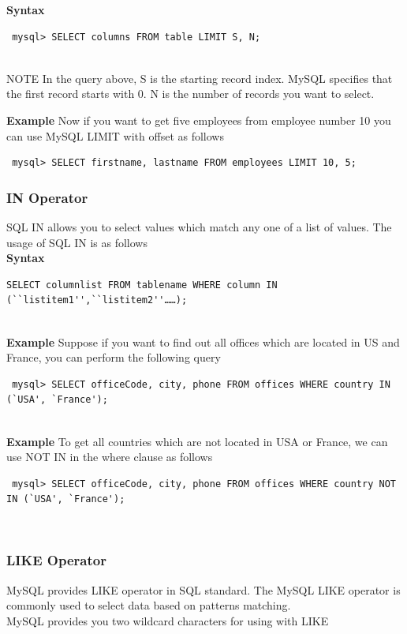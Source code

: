 \documentclass[11pt,a4paper]{article}
\begin{document}
\textbf{Syntax}\\
\begin{verbatim} mysql> SELECT columns FROM table LIMIT S, N; \end{verbatim}\\
NOTE In the query above, S is the starting record index. MySQL specifies that the first record starts with 0. N is the number of records you want to select.

\textbf{Example}
Now if you want to get five employees from employee number 10 you can use MySQL LIMIT with offset as follows\\
\begin{verbatim} mysql> SELECT firstname, lastname FROM employees LIMIT 10, 5; \end{verbatim}

\subsubsection*{IN Operator}
SQL IN allows you to select values which match any one of a list of values. The usage of SQL IN is as follows\\
\textbf{Syntax}\\
\begin{verbatim}SELECT columnlist FROM tablename WHERE column IN (``listitem1'',``listitem2''……); \end{verbatim}\\

\textbf{Example}
Suppose if you want to find out all offices which are located in US and France, you can perform the following query\\

\begin{verbatim} mysql> SELECT officeCode, city, phone FROM offices WHERE country IN (`USA', `France'); \end{verbatim}\\

\textbf{Example}
To get all countries which are not located in USA or France, we can use NOT IN in the where clause as follows\\

\begin{verbatim} mysql> SELECT officeCode, city, phone FROM offices WHERE country NOT IN (`USA', `France'); \end{verbatim}\\

\subsubsection*{LIKE Operator}
MySQL provides LIKE operator in SQL standard. The MySQL LIKE operator is commonly used to select data based on patterns matching.\\
MySQL provides you two wildcard characters for using with LIKE\\
\end{document}
